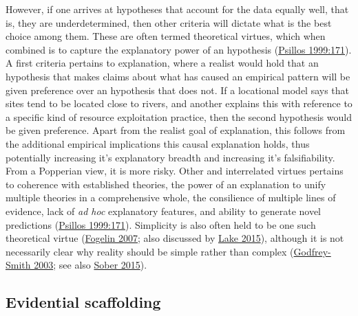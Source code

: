 \documentclass[
  a4paper,
  oneside]{uiophdthesis}
\begin{document}
However, if one arrives at hypotheses that account for the data equally well, that is, they are underdetermined, then other criteria will dictate what is the best choice among them. These are often termed theoretical virtues, which when combined is to capture the explanatory power of an hypothesis (\protect\hyperlink{ref-psillos1999}{Psillos 1999:171}). A first criteria pertains to explanation, where a realist would hold that an hypothesis that makes claims about what has caused an empirical pattern will be given preference over an hypothesis that does not. If a locational model says that sites tend to be located close to rivers, and another explains this with reference to a specific kind of resource exploitation practice, then the second hypothesis would be given preference. Apart from the realist goal of explanation, this follows from the additional empirical implications this causal explanation holds, thus potentially increasing it's explanatory breadth and increasing it's falsifiability. From a Popperian view, it is more risky. Other and interrelated virtues pertains to coherence with established theories, the power of an explanation to unify multiple theories in a comprehensive whole, the consilience of multiple lines of evidence, lack of \emph{ad hoc} explanatory features, and ability to generate novel predictions (\protect\hyperlink{ref-psillos1999}{Psillos 1999:171}). Simplicity is also often held to be one such theoretical virtue (\protect\hyperlink{ref-fogelin2007}{Fogelin 2007}; also discussed by \protect\hyperlink{ref-lake2015}{Lake 2015}), although it is not necessarily clear why reality should be simple rather than complex (\protect\hyperlink{ref-godfrey-smith2003}{Godfrey-Smith 2003}; see also \protect\hyperlink{ref-sober2015}{Sober 2015}).

\hypertarget{evidential-scaffolding}{%
\subsection{Evidential scaffolding}\label{evidential-scaffolding}}
\end{document}
